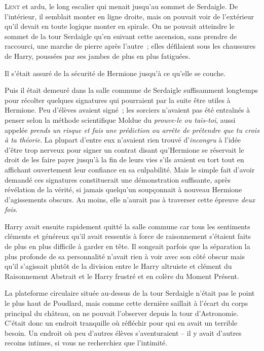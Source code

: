 
\lettrine{L}{ent} et ardu, le long escalier qui menait jusqu'au sommet de Serdaigle.
De l'intérieur, il semblait monter en ligne droite, mais on pouvait voir de l'extérieur qu'il devait en toute logique monter en spirale.
On ne pouvait atteindre le sommet de la tour Serdaigle qu'en suivant cette ascension, sans prendre de raccourci, une marche de pierre après l'autre~; elles défilaient sous les chaussures de Harry, poussées par ses jambes de plus en plus fatiguées.

Il s'était assuré de la sécurité de Hermione jusqu'à ce qu'elle se couche.

Puis il était demeuré dans la salle commune de Serdaigle suffisamment longtemps pour récolter quelques signatures qui pourraient par la suite être utiles à Hermione.
Peu d'élèves avaient signé~; les sorciers n'avaient pas été entraînés à penser selon la méthode scientifique Moldue du \emph{prouve-le ou tais-toi}, aussi appelée \emph{prends un risque et fais une prédiction ou arrête de prétendre que tu crois à ta théorie}.
La plupart d'entre eux n'avaient rien trouvé d'\emph{incongru} à l'idée d'être trop nerveux pour signer un contrat disant qu'Hermione se réservait le droit de les faire payer jusqu'à la fin de leurs vies s'ils avaient eu tort tout en affichant ouvertement leur confiance en sa culpabilité.
Mais le simple fait d'avoir demandé ces signatures constituerait une démonstration suffisante, après révélation de la vérité, si jamais quelqu'un soupçonnait à nouveau Hermione d'agissements obscurs.
Au moins, elle n'aurait pas à traverser cette épreuve \emph{deux fois}.

Harry avait ensuite rapidement quitté la salle commune car tous les sentiments cléments et généreux qu'il avait ressentis à force de raisonnement s'étaient faits de plus en plus difficile à garder en tête.
Il songeait parfois que la séparation la plus profonde de sa personnalité n'avait rien à voir avec son côté obscur mais qu'il s'agissait plutôt de la division entre le Harry altruiste et clément du Raisonnement Abstrait et le Harry frustré et en colère du Moment Présent.

La plateforme circulaire située au-dessus de la tour Serdaigle n'était pas le point le plus haut de Poudlard, mais comme cette dernière saillait à l'écart du corps principal du château, on ne pouvait l'observer depuis la tour d'Astronomie.
C'était donc un endroit tranquille où réfléchir pour qui en avait un terrible besoin.
Un endroit où peu d'autres élèves s'aventuraient -- il y avait d'autres recoins intimes, si vous ne recherchiez que l'intimité.

